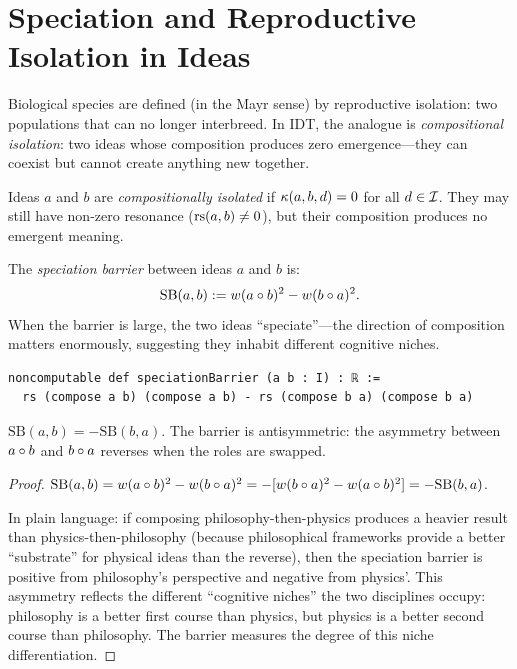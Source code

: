 \section{Speciation and Reproductive Isolation in Ideas}

Biological species are defined (in the Mayr sense) by reproductive isolation:
two populations that can no longer interbreed.  In IDT, the analogue is
\emph{compositional isolation}: two ideas whose composition produces zero
emergence---they can coexist but cannot create anything new together.

\begin{definition}
\label{def:compositional-isolation}
Ideas $a$ and $b$ are \emph{compositionally isolated} if
$\kappa(a, b, d) = 0$ for all $d \in \mathcal{I}$.  They may still have
non-zero resonance ($\mathrm{rs}(a, b) \neq 0$), but their composition produces
no emergent meaning.
\end{definition}

\begin{definition}
\label{def:speciation-barrier}
The \emph{speciation barrier} between ideas $a$ and $b$ is:
\[
  \text{SB}(a, b) := w(a \circ b)^2 - w(b \circ a)^2.
\]
When the barrier is large, the two ideas ``speciate''---the direction of
composition matters enormously, suggesting they inhabit different cognitive
niches.

\begin{lstlisting}[caption={Lean 4: Speciation barrier}]
noncomputable def speciationBarrier (a b : I) : ℝ :=
  rs (compose a b) (compose a b) - rs (compose b a) (compose b a)
\end{lstlisting}
\end{definition}

\begin{theorem}
\label{thm:speciation-antisymm}
$\text{SB}(a, b) = -\text{SB}(b, a)$.  The barrier is antisymmetric: the
asymmetry between $a \circ b$ and $b \circ a$ reverses when the roles
are swapped.
\end{theorem}

\begin{proof}
$\text{SB}(a, b) = w(a \circ b)^2 - w(b \circ a)^2 = -[w(b \circ a)^2
- w(a \circ b)^2] = -\text{SB}(b, a)$.

In plain language: if composing philosophy-then-physics produces a heavier
result than physics-then-philosophy (because philosophical frameworks provide
a better ``substrate'' for physical ideas than the reverse), then the
speciation barrier is positive from philosophy's perspective and negative from
physics'.  This asymmetry reflects the different ``cognitive niches'' the two
disciplines occupy: philosophy is a better first course than physics, but
physics is a better second course than philosophy.  The barrier measures the
degree of this niche differentiation.
\end{proof}

